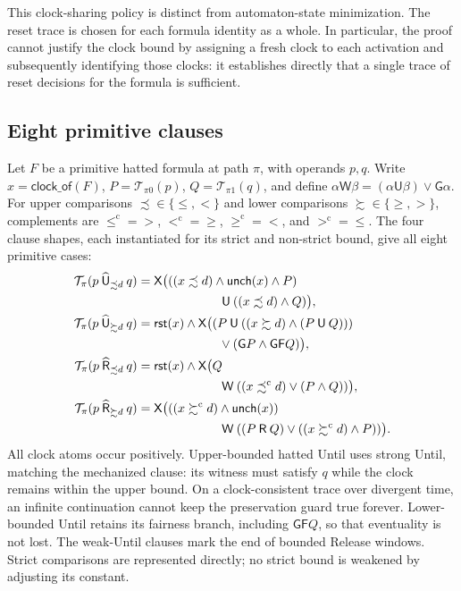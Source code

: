\documentclass[10pt,journal,compsoc]{IEEEtran}
\newcommand{\Until}{\mathbin{\mathsf{U}}}
\newcommand{\Release}{\mathbin{\mathsf{R}}}
\newcommand{\hUntil}{\mathbin{\widehat{\mathsf{U}}}}
\newcommand{\hRelease}{\mathbin{\widehat{\mathsf{R}}}}
\newcommand{\Next}{\mathsf{X}}
\newcommand{\Always}{\mathsf{G}}
\newcommand{\Eventually}{\mathsf{F}}
\newcommand{\WeakUntil}{\mathbin{\mathsf{W}}}
\newcommand{\Reset}{\mathsf{rst}}
\newcommand{\Unch}{\mathsf{unch}}
\newcommand{\T}{\mathcal{T}}
\begin{document}
This clock-sharing policy is distinct from automaton-state minimization. The
reset trace is chosen for each formula identity as a whole. In particular,
the proof cannot justify the clock bound
by assigning a fresh clock to each activation and subsequently identifying
those clocks: it establishes directly that a single trace of reset decisions
for the formula is sufficient.

\subsection{Eight primitive clauses}
\label{sec:mtlbuchi}
Let $F$ be a primitive hatted formula at path $\pi$, with operands $p,q$.
Write $x=\mathsf{clock\_of}(F)$, $P=\T_{\pi0}(p)$,
$Q=\T_{\pi1}(q)$, and define
$\alpha\WeakUntil\beta=(\alpha\Until\beta)\lor\Always\alpha$.
For upper comparisons $\precsim\in\{\le,<\}$ and lower comparisons
$\succsim\in\{\ge,>\}$, complements are
$\le^{\mathrm c}=>$, $<^{\mathrm c}=\ge$, $\ge^{\mathrm c}=<$, and
$>^{\mathrm c}=\le$. The four clause shapes, each instantiated for its
strict and non-strict bound, give all eight primitive cases:
\begin{align}
\T_\pi(p\hUntil_{\precsim d}q)
 &=\Next\bigl(((x\precsim d)\land\Unch(x)\land P)\nonumber\\
 &\hspace{23mm}\Until((x\precsim d)\land Q)\bigr),\label{eq:t-hule}\\
\T_\pi(p\hUntil_{\succsim d}q)
 &=\Reset(x)\land\Next\bigl((P\Until((x\succsim d)\land(P\Until Q)))\nonumber\\
 &\hspace{23mm}\lor(\Always P\land\Always\Eventually Q)\bigr),\label{eq:t-huge}\\
\T_\pi(p\hRelease_{\precsim d}q)
 &=\Reset(x)\land\Next\bigl(Q\nonumber\\
 &\hspace{23mm}\WeakUntil((x\mathrel{\precsim^{\mathrm c}}d)\lor(P\land Q))\bigr),\label{eq:t-hrle}\\
\T_\pi(p\hRelease_{\succsim d}q)
 &=\Next\bigl(((x\mathrel{\succsim^{\mathrm c}}d)\land\Unch(x))\nonumber\\
 &\hspace{23mm}\WeakUntil((P\Release Q)\lor((x\mathrel{\succsim^{\mathrm c}}d)\land P))\bigr).
 \label{eq:t-hrge}
\end{align}
All clock atoms occur positively. Upper-bounded hatted Until uses strong
Until, matching the mechanized clause: its witness must satisfy $q$ while the
clock remains within the upper bound. On a clock-consistent trace over
divergent time, an infinite continuation cannot keep the preservation guard
true forever. Lower-bounded Until retains its
fairness branch, including $\Always\Eventually Q$, so that eventuality is
not lost. The weak-Until clauses mark the end of bounded Release windows.
Strict comparisons are represented directly; no strict bound is weakened by
adjusting its constant.
\end{document}
